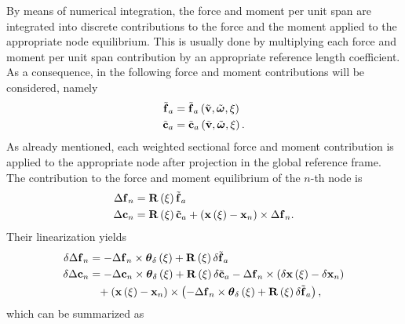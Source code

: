 By means of numerical integration, the force and moment per unit span
are integrated into discrete contributions to the force and the moment
applied to the appropriate node equilibrium.
This is usually done by multiplying each force and moment per unit span
contribution by an appropriate reference length coefficient.
As a consequence, in the following force and moment contributions
will be considered, namely
\begin{subequations}
\begin{align}
	\tilde{\bm{\mathbf{f}}}_a
	&=
	\tilde{\bm{\mathbf{f}}}_a\left( \tilde{\bm{\mathbf{v}}}, \tilde{\bm{\mathbf{\omega}}}, \xi \right)
	\\
	\tilde{\bm{\mathbf{c}}}_a
	&=
	\tilde{\bm{\mathbf{c}}}_a\left( \tilde{\bm{\mathbf{v}}}, \tilde{\bm{\mathbf{\omega}}}, \xi \right)
	.
\end{align}
\end{subequations}
As already mentioned, each weighted sectional force and moment contribution
is applied to the appropriate node after projection in the global reference
frame.
The contribution to the force and moment equilibrium of the $n$-th node is
\begin{subequations}
	\label{eq:aero:fm-contrib}
\begin{align}
	\Delta\bm{\mathbf{f}}_n
	&=
	\bm{\mathbf{R}}\left( \xi \right) \tilde{\bm{\mathbf{f}}}_a
	\label{eq:aero:fm-contrib:f}
	\\
	\Delta\bm{\mathbf{c}}_n
	&=
	\bm{\mathbf{R}}\left( \xi \right) \tilde{\bm{\mathbf{c}}}_a
	+ \left( \bm{\mathbf{x}}\left( \xi \right) - \bm{\mathbf{x}}_n \right) \times \Delta\bm{\mathbf{f}}_n
	\label{eq:aero:fm-contrib:m}
	.
\end{align}
\end{subequations}
Their linearization yields
\begin{subequations}
\begin{align}
	\delta\Delta\bm{\mathbf{f}}_n
	&=
	- \Delta\bm{\mathbf{f}}_n \times \bm{\mathbf{\theta}}_{\delta}\left( \xi \right)
	+ \bm{\mathbf{R}}\left( \xi \right) \delta\tilde{\bm{\mathbf{f}}}_a
	\\
	\delta\Delta\bm{\mathbf{c}}_n
	&=
	- \Delta\bm{\mathbf{c}}_n \times \bm{\mathbf{\theta}}_{\delta}\left( \xi \right)
	+ \bm{\mathbf{R}}\left( \xi \right) \delta\tilde{\bm{\mathbf{c}}}_a
	- \Delta\bm{\mathbf{f}}_n \times \left( 
		\delta\bm{\mathbf{x}}\left( \xi \right)
		- \delta\bm{\mathbf{x}}_n
	 \right)
	\nonumber \\
	&\hphantom{= } \mbox{}
	+ \left( 
		\bm{\mathbf{x}}\left( \xi \right)
		- \bm{\mathbf{x}}_n
	 \right) \times \left( 
		- \Delta\bm{\mathbf{f}}_n \times \bm{\mathbf{\theta}}_{\delta}\left( \xi \right)
		+ \bm{\mathbf{R}}\left( \xi \right) \delta\tilde{\bm{\mathbf{f}}}_a
	 \right)
	,
\end{align}
\end{subequations}
which can be summarized as
